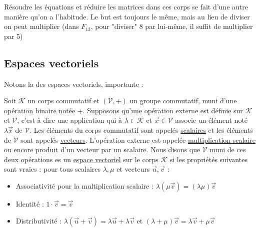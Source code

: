 \documentclass[11pt,a4paper]{article}
\renewcommand{\)}{\right)}
\renewcommand{\(}{\left(}
\newcommand{\m}[1]{\ensuremath{\mathcal{#1}}}
\begin{document}
Résoudre les équations et réduire les matrices dans ces corps se fait d'une autre manière qu'on a l'habitude. Le but est toujours le même, mais au lieu de diviser on peut multiplier (dans $F_{13}$, pour "diviser" 8 par lui-même, il suffit de multiplier par 5)

\subsection{Espaces vectoriels}
Notons la  des espaces vectoriels, importante :

Soit $\mathcal{K}$ un corps commutatif et $(\mathcal{V},\mathcal{+})$ un groupe commutatif, muni d'une opération binaire notée +. Supposons qu'une \uline{opération externe} est définie sur $\m{K}$ et $\m{V}$, c'est à dire une application qui à $\lambda \in \m{K}$ et $\vec{x} \in \m{V}$ associe un élément noté $\lambda\vec{x}$ de \m{V}. Les éléments du corps commutatif sont appelés \uline{scalaires} et les éléments de \m{V} sont appelés \uline{vecteurs}. L'opération externe est appelée \uline{multiplication scalaire} ou encore produit d'un vecteur par un scalaire. Nous disons que \m{V} muni de ces deux opérations es un \uline{espace vectoriel} sur le corps \m{K} si les propriétés suivantes sont vraies : pour tous scalaires $\lambda,\mu$ et vecteurs $\vec{u},\vec{v}$ :
\begin{itemize}
	\item 	Associativité pour la multiplication scalaire : $\lambda(\mu \vec{v}) = (\lambda\mu)\vec{v}$
	\item 	Identité : $1\cdot\vec{v} = \vec{v}$
	\item 	Distributivité : $\lambda(\vec{u}+\vec{v}) = \lambda\vec{u} + \lambda\vec{v}$ et $(\lambda + \mu)\vec{v} = \lambda\vec{v} + \mu\vec{v}$
\end{itemize}
\end{document}
